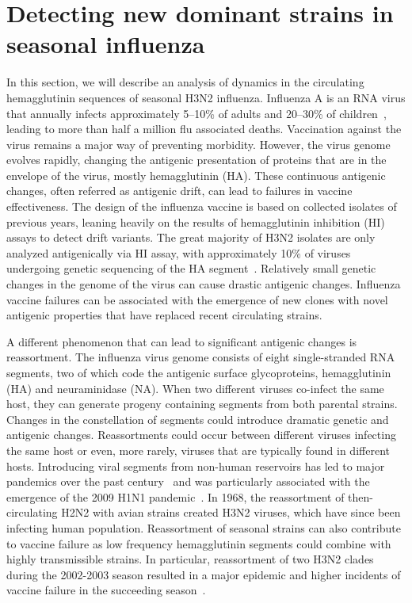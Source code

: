 \documentclass[a4paper,11pt]{article}
\begin{document}

\section{Detecting new dominant strains in seasonal influenza}\label{sec:flu}

In this section, we will describe an analysis of dynamics in the circulating hemagglutinin sequences of seasonal H3N2 influenza.
Influenza A is an RNA virus that annually infects approximately 5--10\% of adults and 20--30\% of children~\cite{WHO}, leading to more than half a million flu associated deaths.
Vaccination against the virus remains a major way of preventing morbidity.
However, the virus genome evolves rapidly, changing the antigenic presentation of proteins that are in the envelope of the virus, mostly hemagglutinin (HA).
These continuous antigenic changes, often referred as antigenic drift, can lead to failures in vaccine effectiveness.
The design of the influenza vaccine is based on collected isolates of previous years, leaning heavily on the results of hemagglutinin inhibition (HI) assays to detect drift variants.
The great majority of H3N2 isolates are only analyzed antigenically via HI assay, with approximately 10\% of viruses undergoing genetic sequencing of the HA segment~\cite{russell2008influenza}.
Relatively small genetic changes in the genome of the virus can cause drastic antigenic changes.
Influenza vaccine failures can be associated with the emergence of new clones with novel antigenic properties that have replaced recent circulating strains.

A different phenomenon that can lead to significant antigenic changes is reassortment.
The influenza virus genome consists of eight single-stranded RNA segments, two of which code the antigenic surface glycoproteins, hemagglutinin (HA) and neuraminidase (NA).
When two different viruses co-infect the same host, they can generate  progeny containing segments from both parental strains.
Changes in the constellation of segments could introduce dramatic genetic and antigenic changes.
Reassortments could occur between different viruses infecting the same host or even, more rarely, viruses that are typically found in different hosts.
Introducing viral segments from non-human reservoirs has led to major pandemics over the past century~\cite{rabadan2007evolution, rabadan2008non} and was particularly associated with the emergence of the 2009 H1N1 pandemic~\cite{trifonov2009geographic, solovyov2009cluster}.
In 1968, the reassortment of then-circulating H2N2 with avian strains created H3N2 viruses, which have since been infecting human population.
Reassortment of seasonal strains can also contribute to vaccine failure as low frequency hemagglutinin segments could combine with highly transmissible strains.
In particular, reassortment of two H3N2 clades during the 2002-2003 season resulted in a major epidemic and higher incidents of vaccine failure in the succeeding season~\cite{centers2004preliminary}.
\end{document}
